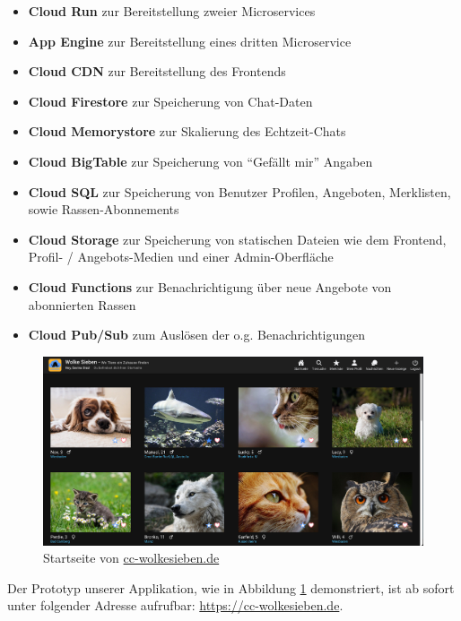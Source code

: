 \documentclass{article}
\begin{document}
\begin{itemize}
    \item \textbf{Cloud Run} zur Bereitstellung zweier Microservices
    \item \textbf{App Engine} zur Bereitstellung eines dritten Microservice
    \item \textbf{Cloud CDN} zur Bereitstellung des Frontends
    \item \textbf{Cloud Firestore} zur Speicherung von Chat-Daten
    \item \textbf{Cloud Memorystore} zur Skalierung des Echtzeit-Chats
    \item \textbf{Cloud BigTable} zur Speicherung von \enquote{Gefällt mir} Angaben
    \item \textbf{Cloud SQL} zur Speicherung von Benutzer Profilen, Angeboten, Merklisten, sowie Rassen-Abonnements 
    \item \textbf{Cloud Storage} zur Speicherung von statischen Dateien wie dem Frontend, Profil- / Angebots-Medien und einer Admin-Oberfläche
    \item \textbf{Cloud Functions} zur Benachrichtigung über neue Angebote von abonnierten Rassen
    \item \textbf{Cloud Pub/Sub} zum Auslösen der o.g. Benachrichtigungen 
\end{itemize}

\begin{figure}[htbp]
\centering
\label{fig:homepage}
\includegraphics[width=\textwidth]{images/homepage}
\caption{Startseite von \href{https://cc-wolkesieben.de}{cc-wolkesieben.de}}
\end{figure}

Der Prototyp unserer Applikation, wie in Abbildung \ref{fig:homepage} demonstriert, ist ab sofort unter folgender Adresse aufrufbar: \url{https://cc-wolkesieben.de}.

\end{document}
